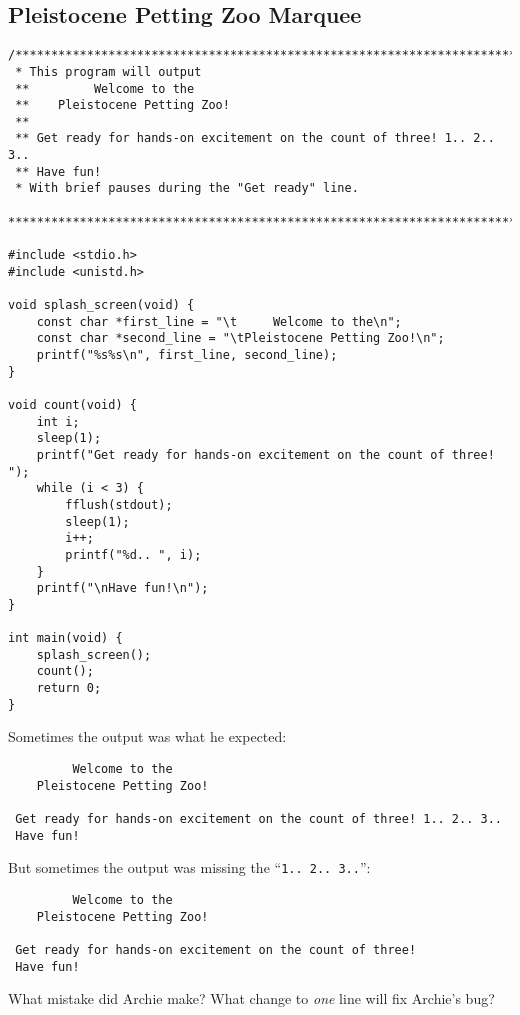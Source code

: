 \subsection{Pleistocene Petting Zoo Marquee} \label{subsec:uninitializedvariables}

\transitionzero

\begin{lstlisting}
/***********************************************************************
 * This program will output
 **         Welcome to the
 **    Pleistocene Petting Zoo!
 **
 ** Get ready for hands-on excitement on the count of three! 1.. 2.. 3..
 ** Have fun!
 * With brief pauses during the "Get ready" line.
 ***********************************************************************/

#include <stdio.h>
#include <unistd.h>

void splash_screen(void) {
    const char *first_line = "\t     Welcome to the\n";
    const char *second_line = "\tPleistocene Petting Zoo!\n";
    printf("%s%s\n", first_line, second_line);
}

void count(void) {
    int i;
    sleep(1);
    printf("Get ready for hands-on excitement on the count of three! ");
    while (i < 3) {
        fflush(stdout);
        sleep(1);
        i++;
        printf("%d.. ", i);
    }
    printf("\nHave fun!\n");
}

int main(void) {
    splash_screen();
    count();
    return 0;
}
\end{lstlisting}

Sometimes the output was what he expected:
\begin{verbatim}
         Welcome to the
    Pleistocene Petting Zoo!

 Get ready for hands-on excitement on the count of three! 1.. 2.. 3..
 Have fun!
\end{verbatim}

But sometimes the output was missing the
``\texttt{1.. 2.. 3..}'':
\begin{verbatim}
         Welcome to the
    Pleistocene Petting Zoo!

 Get ready for hands-on excitement on the count of three!
 Have fun!
\end{verbatim}

What mistake did Archie make?
What change to \textit{one} line will fix Archie's bug?
\begin{description}
\end{description}


